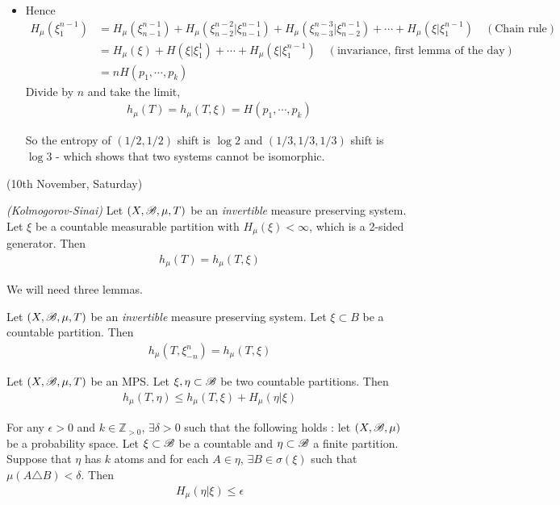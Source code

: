\documentclass[12pt,a4paper]{report}
\newenvironment{subproof}
{\begin{changemargin}{0.5cm}{0.5cm}
	}%
	{\end{changemargin}
}
\begin{document}
\begin{itemize}
\begin{subproof}
\eop
\end{subproof}
\s

\item Hence
\begin{align*}
H_{\mu}(\xi_1^{n-1}) &= H_{\mu}(\xi_{n-1}^{n-1}) + H_{\mu}(\xi_{n-2}^{n-2} | \xi_{n-1}^{n-1}) + H_{\mu}(\xi_{n-3}^{n-3} | \xi_{n-2}^{n-1}) + \cdots + H_{\mu}(\xi | \xi^{n-1}_{1}) \quad (\text{Chain rule}) \\
&= H_{\mu}(\xi) + H(\xi |\xi_1^1) + \cdots + H_{\mu}(\xi | \xi_1^{n-1}) \quad (\text{invariance, first lemma of the day}) \\
&= nH(p_1, \cdots, p_k)
\end{align*}
Divide by $n$ and take the limit, 
\begin{align*}
h_{\mu}(T) = h_{\mu}(T,\xi) = H(p_1, \cdots, p_k)
\end{align*}

So the entropy of $(1/2,1/2)$ shift is $\log2$ and $(1/3,1/3,1/3)$ shift is $\log3$ - which shows that two systems cannot be isomorphic.
\end{itemize}
\s

\newday

(10th November, Saturday)
\s

\thm \emph{(Kolmogorov-Sinai)} Let $(X,\mathscr{B}, \mu, T)$ be an \emph{invertible} measure preserving system. Let $\xi$ be a countable measurable partition with $H_{\mu}(\xi) < \infty$, which is a 2-sided generator. Then
\begin{align*}
h_{\mu}(T) = h_{\mu}(T,\xi)
\end{align*}
\s

We will need three lemmas.
\s

 Let $(X,\mathscr{B}, \mu, T)$ be an \emph{invertible} measure preserving system. Let $\xi \subset B$ be a countable partition. Then
\begin{align*}
h_{\mu}(T, \xi^n_{-n}) = h_{\mu}(T,\xi)
\end{align*}
\s

 Let $(X,\mathscr{B}, \mu, T)$ be an MPS. Let $\xi, \eta \subset \mathscr{B}$ be two countable partitions. Then
\begin{align*}
h_{\mu}(T,\eta) \leq h_{\mu}(T, \xi) + H_{\mu}(\eta | \xi)
\end{align*}
\s

 For any $\epsilon>0$ and $k\in \mathbb{Z}_{>0}$, $\exists \delta >0$ such that the following holds : let $(X, \mathscr{B}, \mu)$ be a probability space. Let $\xi \subset \mathscr{B}$ be a countable and $\eta \subset \mathscr{B}$ a finite partition. Suppose that $\eta$ has $k$ atoms and for each $A\in \eta$, $\exists B\in \sigma(\xi)$ such that $\mu(A \triangle B) <\delta$. Then 
\begin{align*}
H_{\mu}(\eta | \xi) \leq \epsilon
\end{align*}
\s
\end{document}

